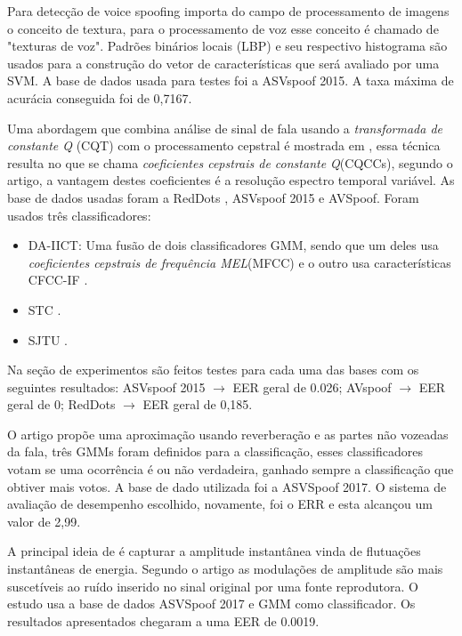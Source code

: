 \begin{myenv}{1.5}
		\par Para detecção de voice spoofing  \cite{ISI:000473343500086} importa do campo de processamento de imagens o conceito de textura, para o processamento de voz esse conceito é chamado de "texturas de voz". Padrões binários locais (LBP) e seu respectivo histograma são usados para a construção do vetor de características que será avaliado por uma SVM. A base de dados usada para testes foi a ASVspoof 2015. A taxa máxima de acurácia conseguida foi de 0,7167.
		
		\par Uma abordagem que combina análise de sinal de fala usando a \textit{transformada de constante Q} (CQT) com o processamento cepstral é mostrada em \cite{TODISCO2017516}, essa técnica resulta no que se chama \textit{coeficientes cepstrais de constante Q}(CQCCs), segundo o artigo, a vantagem destes coeficientes é a resolução espectro temporal variável. As base de dados usadas foram a RedDots \cite{redDots}, ASVspoof 2015 e AVSpoof. Foram usados três classificadores:
		\begin{itemize}
			\item DA-IICT: Uma fusão de dois classificadores GMM, sendo que um deles usa \textit{coeficientes cepstrais de frequência MEL}(MFCC) e o outro usa características CFCC-IF \cite{Patel2015}.
			\item STC \cite{7472724}.
			\item SJTU \cite{korshunov2016overview}.
		\end{itemize}			
		Na seção de experimentos são feitos testes para cada uma das bases com os seguintes resultados: ASVspoof 2015 $\rightarrow$ EER geral de 0.026; AVspoof $\rightarrow$ EER geral de 0; RedDots $\rightarrow$ EER geral de 0,185.

		\par O artigo \cite{ISI:000490497200068} propõe uma aproximação usando reverberação e as partes não vozeadas da fala, três GMMs foram definidos para a classificação, esses classificadores votam se uma ocorrência é ou não verdadeira, ganhado sempre a classificação que obtiver mais votos. A base de dado utilizada foi a ASVSpoof 2017. O sistema de avaliação de desempenho escolhido, novamente, foi o ERR e esta alcançou um valor de 2,99.
		
		\par A principal ideia de \cite{ISI:000465363900136} é capturar a amplitude instantânea vinda de flutuações instantâneas de energia. Segundo o artigo as modulações de amplitude são mais suscetíveis ao ruído inserido no sinal original por uma fonte reprodutora. O estudo usa a base de dados ASVSpoof 2017 e GMM como classificador. Os resultados apresentados chegaram a uma EER de 0.0019.


\end{myenv}
